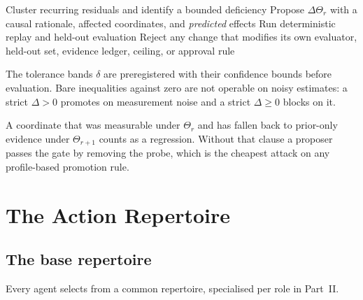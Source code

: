 \documentclass[11pt]{article}
\begin{document}
\begin{algorithm}[H]
\caption{Slow loop --- governed structural change (all agents)}
\label{alg:slow}
\SetAlgoLined
{}
Cluster recurring residuals and identify a bounded deficiency\;
Propose $\Delta\Theta_r$ with a causal rationale, affected coordinates, and \emph{predicted} effects\;
Run deterministic replay and held-out evaluation\;
Reject any change that modifies its own evaluator, held-out set, evidence ledger, ceiling, or approval rule\;
\end{algorithm}

The tolerance bands $\delta$ are preregistered with their confidence bounds before evaluation. Bare inequalities against zero are not operable on noisy estimates: a strict $\Delta>0$ promotes on measurement noise and a strict $\Delta\ge0$ blocks on it.

A coordinate that was measurable under $\Theta_r$ and has fallen back to prior-only evidence under $\Theta_{r+1}$ counts as a regression. Without that clause a proposer passes the gate by removing the probe, which is the cheapest attack on any profile-based promotion rule.

\section{The Action Repertoire}
\label{sec:actions}

\subsection{The base repertoire}

Every agent selects from a common repertoire, specialised per role in Part~II.
\end{document}
